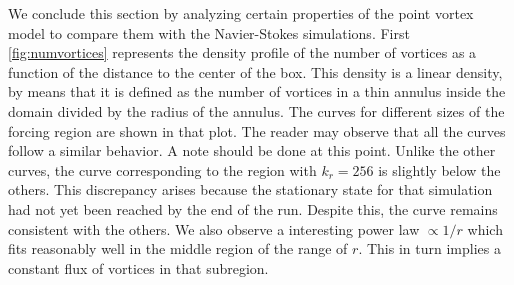 \documentclass[../main.tex]{subfiles}
\begin{document}
We conclude this section by analyzing certain properties of the point vortex model to compare them with the Navier-Stokes simulations. First \cref{fig:numvortices} represents the density profile of the number of vortices as a function of the distance to the center of the box. This density is a linear density, by means that it is defined as the number of vortices in a thin annulus inside the domain divided by the radius of the annulus. The curves for different sizes of the forcing region are shown in that plot. The reader may observe that all the curves follow a similar behavior. A note should be done at this point. Unlike the other curves, the curve corresponding to the region with $k_r=256$ is slightly below the others. This discrepancy arises because the stationary state for that simulation had not yet been reached by the end of the run. Despite this, the curve remains consistent with the others. We also observe a interesting power law $\propto 1/r$ which fits reasonably well in the middle region of the range of $r$. This in turn implies a constant flux of vortices in that subregion.
\end{document}
